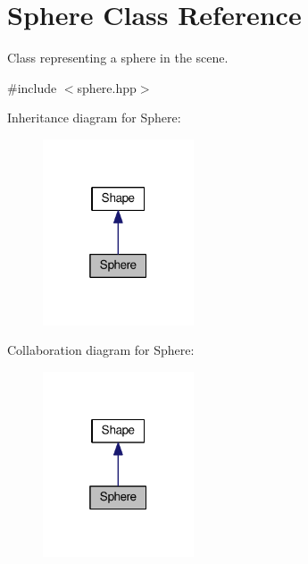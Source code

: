 \hypertarget{class_sphere}{}\section{Sphere Class Reference}
\label{class_sphere}


Class representing a sphere in the scene.  




{\ttfamily \#include $<$sphere.\+hpp$>$}



Inheritance diagram for Sphere\+:
\nopagebreak
\begin{figure}[H]
\begin{center}
\leavevmode
\includegraphics[width=127pt]{class_sphere__inherit__graph}
\end{center}
\end{figure}


Collaboration diagram for Sphere\+:
\nopagebreak
\begin{figure}[H]
\begin{center}
\leavevmode
\includegraphics[width=127pt]{class_sphere__coll__graph}
\end{center}
\end{figure}
